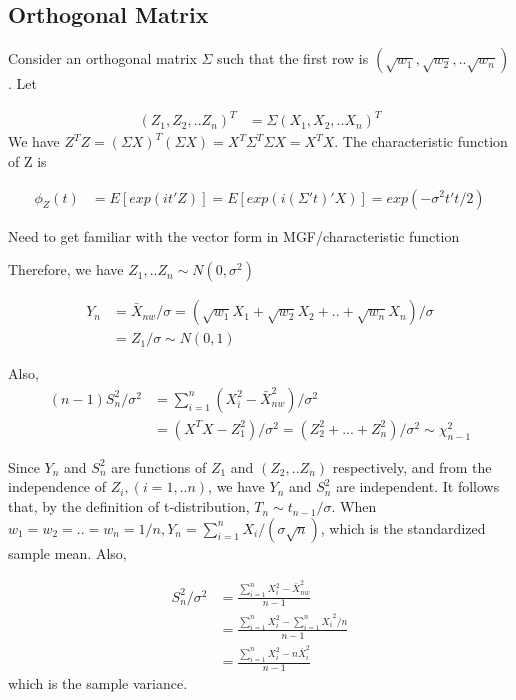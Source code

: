 \subsection{Orthogonal Matrix}

Consider an orthogonal matrix $\Sigma$ such that the first row is $(\sqrt{w_1}, \sqrt{w_2},.. \sqrt{w_n})$. Let

\begin{align*}
	(Z_1, Z_2,.. Z_n)^T &= \Sigma  (X_1, X_2,.. X_n)^T
\end{align*}
We have $Z^T Z = (\Sigma X)^T (\Sigma X) = X^T \Sigma^T \Sigma X = X^T X$. The characteristic function of Z is 

\begin{align*}
	\phi_Z(t) &= E[exp(i t'Z)] = E[exp(i (\Sigma' t)' X)] = exp(-\sigma^2 t't/2)
\end{align*}

Need to get familiar with the vector form in MGF/characteristic function

Therefore, we have $Z_1, .. Z_n \sim N(0, \sigma^2)$ 

\begin{align*}
	Y_n &= \bar{X}_{nw}/\sigma = (\sqrt{w_1} X_1 + \sqrt{w_2} X_2 + .. + \sqrt{w_n} X_n)/\sigma\\
	&= Z_1/\sigma \sim N(0,1)
\end{align*}

Also, 
\begin{align*}
	(n-1) S_n^2/\sigma^2 &= \sum_{i=1}^n (X_i^2 - \bar{X}_{nw}^2)/\sigma^2 \\
	&= (X^T X - Z_1^2)/\sigma^2 = (Z_2^2 + ... + Z_n^2)/\sigma^2 \sim \chi^2_{n-1}
\end{align*}

Since $Y_n$ and $S_n^2$ are functions of $Z_1$ and $(Z_2,.. Z_n)$ respectively, and from the independence of $Z_i, (i=1,..n)$, we have $Y_n$ and $S_n^2$ are independent. It follows that, by the definition of t-distribution, $T_n \sim t_{n-1}/\sigma$. When $w_1=w_2=..=w_n=1/n, Y_n = \sum_{i=1}^n X_i/(\sigma \sqrt{n})$, which is the standardized sample mean. Also,

\begin{align*}
	S_n^2/\sigma^2 &= \frac{\sum_{i=1}^n X_i^2 - \bar{X}_{nw}^2 }{n-1} \\
	&= \frac{\sum_{i=1}^n X_i^2 - {\sum_{i=1}^n X_i}^2/n }{n-1}\\
	&= \frac{\sum_{i=1}^n X_i^2 -  n\bar{X}_i^2 }{n-1}
\end{align*} 	   
which is the sample variance.


